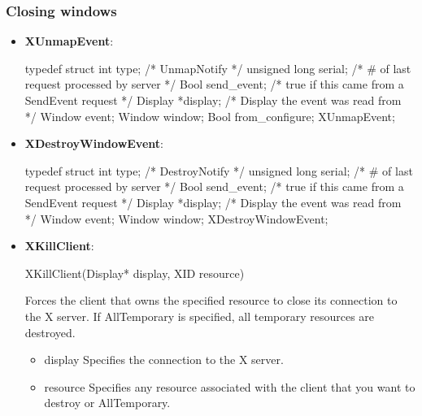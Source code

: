 \documentclass{report}
\begin{document}
    \subsubsection{Closing windows}
    \begin{itemize}
        \item \textbf{XUnmapEvent}:
            \bigbreak \noindent 
            \begin{cppcode}
                typedef struct {
                    int type;               /* UnmapNotify */
                    unsigned long serial;   /* # of last request processed by server */
                    Bool send_event;        /* true if this came from a SendEvent request */
                    Display *display;       /* Display the event was read from */
                    Window event;
                    Window window;
                    Bool from_configure;
                } XUnmapEvent;
            \end{cppcode}
        \item \textbf{XDestroyWindowEvent}:
            \bigbreak \noindent 
            \begin{cppcode}
                typedef struct {
                    int type; /* DestroyNotify */
                    unsigned long serial; /* # of last request processed by server */
                    Bool send_event; /* true if this came from a SendEvent request */
                    Display *display; /* Display the event was read from */
                    Window event;
                    Window window;
                } XDestroyWindowEvent;
            \end{cppcode}
        \item \textbf{XKillClient}:
            \bigbreak \noindent 
            \begin{cppcode}
                XKillClient(Display* display, XID resource)
            \end{cppcode}
            \bigbreak \noindent
            Forces the client that owns the specified resource to close its connection to the X server. If AllTemporary is specified, all temporary resources are destroyed.
            \begin{itemize}
                \item display Specifies the connection to the X server.
                \item resource Specifies any resource associated with the client that you want to destroy or AllTemporary.
            \end{itemize}

\end{itemize}
\end{document}
